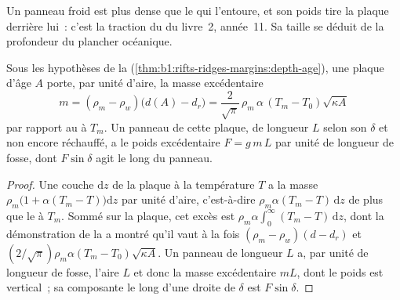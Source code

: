 Un panneau froid est plus dense que le  qui l'entoure, et son poids tire la
plaque derrière lui~: c'est la traction du  du livre~2, année~11. Sa taille se déduit
de la profondeur du plancher océanique.

\begin{proposition}\label{prop:b1:active-margins:slab-weight}
Sous les hypothèses de la 
(\cref{thm:b1:rifts-ridges-margins:depth-age}), une plaque d'âge $A$ porte, par
unité d'aire, la masse excédentaire
\[
  m = (\rho_m - \rho_w)\bigl(d(A) - d_r\bigr)
    = \frac{2}{\sqrt\pi}\,\rho_m\,\alpha\,(T_m - T_0)\sqrt{\kappa A}
\]
par rapport au  à $T_m$. Un panneau de cette plaque, de longueur $L$ selon son 
$\delta$ et non encore réchauffé, a le poids excédentaire $F = g\,m\,L$ par unité de longueur
de fosse, dont $F\sin\delta$ agit le long du panneau.
\end{proposition}

\begin{proof}
Une couche $\mathrm dz$ de la plaque à la température $T$ a la masse
$\rho_m\bigl(1 + \alpha(T_m - T)\bigr)\mathrm dz$ par unité d'aire, c'est-à-dire
$\rho_m\alpha(T_m - T)\,\mathrm dz$ de plus que le  à $T_m$. Sommé sur la
plaque, cet excès est $\rho_m\alpha\int_0^\infty (T_m - T)\,\mathrm dz$, dont la
démonstration de la  a montré qu'il vaut à la fois
$(\rho_m - \rho_w)(d - d_r)$ et $(2/\sqrt\pi)\rho_m\alpha(T_m - T_0)
\sqrt{\kappa A}$. Un panneau de longueur $L$ a, par unité de longueur de fosse, l'aire
$L$ et donc la masse excédentaire $mL$, dont le poids est vertical~; sa composante le long d'une
droite de  $\delta$ est $F\sin\delta$.
\end{proof}

